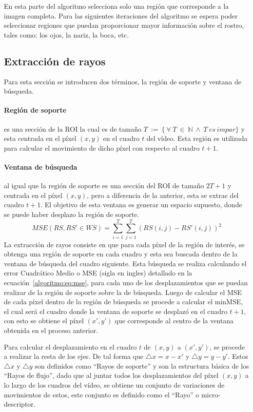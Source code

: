 	En esta parte del algoritmo selecciona solo una región que corresponde a la imagen completa. Para las siguientes iteraciones del algoritmo se espera poder seleccionar regiones que puedan proporcionar mayor información sobre el rostro, tales como: los ojos, la nariz, la boca, etc.

	\subsection{Extracción de rayos}
	\label{algoritmo:ext_rayos}
	Para esta sección se introducen dos términos, la región de soporte y ventana de búsqueda.
	\paragraph{Región de soporte} es una sección de la ROI la cual es de tamaño $T~:=~\{~\forall~T~\in~\mathds{N}~\land~T~es~impar\}$ y esta centrada en el píxel $(x,y)$ en el cuadro $t$ del vídeo. Esta región es utilizada para calcular el movimiento de dicho píxel con respecto al cuadro $t+1$.
	\paragraph{Ventana de búsqueda} al igual que la región de soporte es una sección del ROI de tamaño $2T+1$ y centrada en el píxel $(x,y)$, pero a diferencia de la anterior, esta se extrae del cuadro $t+1$. El objetivo de esta ventana es generar un espacio supuesto, donde se puede haber desplazo la región de soporte.
		\begin{equation}\label{algoritmo:eq:mse}	
			MSE(RS, RS' \in WS) = \sum_{i=1}^{T} \sum_{j=1}^{T} (RS(i,j) - RS'(i,j))^2
		\end{equation}
	La extracción de rayos consiste en que para cada píxel de la región de interés, se obtenga una región de soporte en cada cuadro y esta sea buscada dentro de la ventana de búsqueda del cuadro siguiente. Esta búsqueda se realiza calculando el error Cuadrático Medio o MSE (sigla en ingles) detallado en la ecuación~\ref{algoritmo:eq:mse}, para cada uno de los desplazamientos que se puedan realizar de la región de soporte sobre la de búsqueda. Luego de calcular el MSE de cada píxel dentro de la región de búsqueda se procede a calcular el minMSE, el cual será el cuadro donde la ventana de soporte se desplazó en el cuadro $t+1$, con esto se obtiene el píxel $(x',y')$ que corresponde al centro de la ventana obtenida en el proceso anterior.
	
	Para calcular el desplazamiento en el cuadro $t$ de $(x,y)$ a $(x',y')$, se procede a realizar la resta de los ejes. De tal forma que  $\triangle x = x-x'$ y $ \triangle y = y-y'$. Estos $ \triangle x$ y $ \triangle y$ son definidos como ``Rayos de soporte'' y son la estructura básica de los ``Rayos de flujo'', dado que al juntar todos los desplazamientos del píxel $(x,y)$ a lo largo de los cuadros del vídeo, se obtiene un conjunto de variaciones de movimientos de estos, este conjunto es definido como el ``Rayo'' o micro-descriptor. 
		

